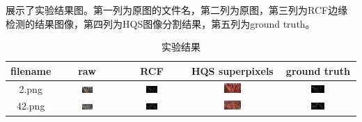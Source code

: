 展示了实验结果图。第一列为原图的文件名，第二列为原图，第三列为RCF边缘检测的结果图像，第四列为HQS图像分割结果，第五列为ground truth。

\begin{table}[htbp]
    \centering
    \caption{实验结果}
    \begin{tabular}{ccccc}
      \toprule
      filename & raw & RCF & HQS superpixels & ground truth \\
      \midrule
      2.png & \includegraphics[width=0.2\textwidth]{pic/raw/2.png} & \includegraphics[width=0.2\textwidth]{pic/rcf/2.png} & \includegraphics[width=0.2\textwidth]{pic/hqs/500/2.png} & \includegraphics[width=0.2\textwidth]{pic/gt/2.png} \\
      42.png & \includegraphics[width=0.2\textwidth]{pic/raw/42.png} & \includegraphics[width=0.2\textwidth]{pic/rcf/42.png} & \includegraphics[width=0.2\textwidth]{pic/hqs/500/42.png} & \includegraphics[width=0.2\textwidth]{pic/gt/42.png} \\

\end{tabular}
\end{table}
